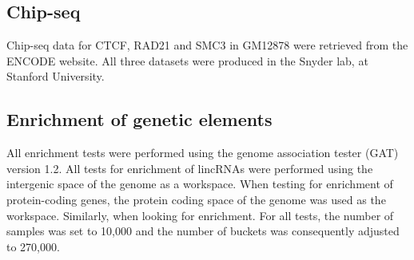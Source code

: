 \documentclass[10pt,a4paper]{report}
\begin{document}
\subsection*{Chip-seq}

Chip-seq data for CTCF, RAD21 and SMC3 in GM12878 were retrieved from the ENCODE website. All three datasets were produced in the Snyder lab, at Stanford University.

\subsection*{Enrichment of genetic elements}

All enrichment tests were performed using the genome association tester (GAT) \cite{Heger2013}⁠ version 1.2. All tests for enrichment of lincRNAs were performed using the intergenic space of the genome as a workspace. When testing for enrichment of protein-coding genes, the protein coding space of the genome was used as the workspace. Similarly, when looking for enrichment. For all tests, the number of samples was set to 10,000 and the number of buckets was consequently adjusted to 270,000.



\end{document}

